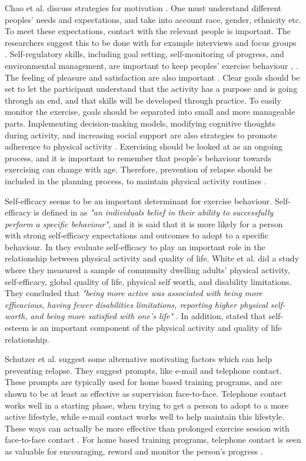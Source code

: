 Chao et al. discuss strategies for motivation \cite{chao}. One must understand different peoples' needs and expectations, and take into account race, gender, ethnicity etc. To meet these expectations, contact with the relevant people is important. The researchers suggest this to be done with for example interviews and focus groups \cite{chao}. Self-regulatory skills, including goal setting, self-monitoring of progress, and environmental management, are important to keep peoples' exercise behaviour \cite{chao}, \cite{schutzer}. The feeling of pleasure and satisfaction are also important \cite{schutzer}.  Clear goals should be set to let the participant understand that the activity has a purpose and is going through an end, and that skills will be developed through practice. To easily monitor the exercise, goals should be separated into small and more manageable parts. Implementing decision-making models, modifying cognitive thoughts during activity, and increasing social support are also strategies to promote adherence to physical activity \cite{chao}.  Exercising should be looked at as an ongoing process, and it is important to remember that people's behaviour towards exercising can change with age. Therefore, prevention of relapse should be included in the planning process, to maintain physical activity routines \cite{chao}. 

Self-efficacy seems to be an important determinant for exercise behaviour. Self-efficacy is defined in \cite{schutzer} as \emph{"an individuals belief in their ability to successfully perform a specific behaviour"}, and it is said that it is more likely for a person with strong self-efficacy expectations and outcomes to adopt to a specific behaviour. In \cite{white} they evaluate self-efficacy to play an important role in the relationship between physical activity and quality of life. White et al. did a study where they measured a sample of community dwelling adults' physical activity, self-efficacy, global quality of life, physical self worth, and disability limitations. They concluded that \emph{"being more active was associated with being more efficacious, having fewer disabilities limitations, reporting higher physical self-worth, and being more satisfied with one's life"} \cite{white}. In addition, \cite{white} stated that self-esteem is an important component of the physical activity and quality of life relationship. 

Schutzer et al. suggest some alternative motivating factors \cite{schutzer} which can help preventing relapse. They suggest prompts, like e-mail and telephone contact. These prompts are typically used for home based training programs, and are shown to be at least as effective as supervision face-to-face. Telephone contact works well in a starting phase, when trying to get a person to adopt to a more active lifestyle, while e-mail contact works well to help maintain this lifestyle. These ways can actually be more effective than prolonged exercise session with face-to-face contact \cite{schutzer}. For home based training programs, telephone contact is seen as valuable for encouraging, reward and monitor the person's progress \cite{chao}.  

